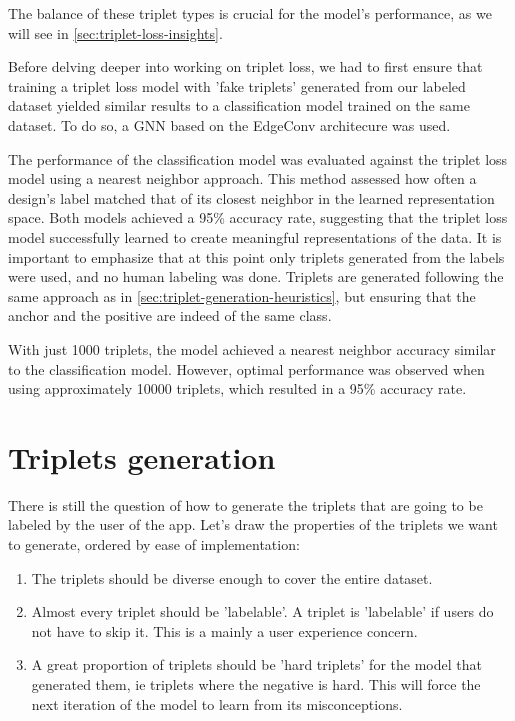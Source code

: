The balance of these triplet types is crucial for the model's performance, as we will see in \autoref{sec:triplet-loss-insights}.

Before delving deeper into working on triplet loss, we had to first ensure that training a triplet loss model with 'fake triplets' generated from our labeled dataset yielded similar results to a classification model trained on the same dataset. To do so, a GNN based on the EdgeConv architecure \cite{wangDynamicGraphCNN2019} was used. 

The performance of the classification model was evaluated against the triplet loss model using a nearest neighbor approach. This method assessed how often a design's label matched that of its closest neighbor in the learned representation space. Both models achieved a 95\% accuracy rate, suggesting that the triplet loss model successfully learned to create meaningful representations of the data. It is important to emphasize that at this point only triplets generated from the labels were used, and no human labeling was done. Triplets are generated following the same approach as in \autoref{sec:triplet-generation-heuristics}, but ensuring that the anchor and the positive are indeed of the same class. 

With just 1000 triplets, the model achieved a nearest neighbor accuracy similar to the classification model. However, optimal performance was observed when using approximately 10000 triplets, which resulted in a 95\% accuracy rate.

\section{Triplets generation}
\label{sec:triplet-generation}

There is still the question of how to generate the triplets that are going to be labeled by the user of the app. Let's draw the properties of the triplets we want to generate, ordered by ease of implementation:
\begin{enumerate}
  \item The triplets should be diverse enough to cover the entire dataset.
  \item Almost every triplet should be 'labelable'. A triplet is 'labelable' if users do not have to skip it. This is a mainly a user experience concern. 
  \item A great proportion of triplets should be 'hard triplets' for the model that generated them, ie triplets where the negative is hard. This will force the next iteration of the model to learn from its misconceptions.
\end{enumerate}


